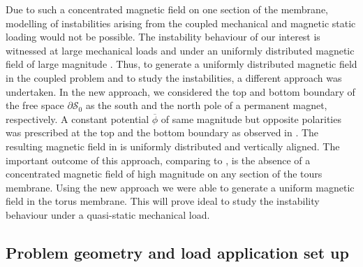 \documentclass[11pt,a4paper,final]{article}
\begin{document}
Due to such a concentrated magnetic field on one section of the membrane, modelling of instabilities arising from the coupled  mechanical and magnetic static loading would not be possible. The instability behaviour of our interest is witnessed at large mechanical loads and under an uniformly distributed magnetic field of large magnitude \cite{Reddy2017,Reddy2018}. Thus, to generate a uniformly distributed magnetic field in the coupled problem and to study the instabilities, a different approach was undertaken. In the new approach, we considered the top and bottom boundary of the free space $\partial \mathcal{S}_0$ as the south and the north pole of a permanent magnet, respectively. A constant potential $\overline{\phi}$ of same magnitude but opposite polarities was prescribed at the top and the bottom boundary as observed in . The resulting magnetic field in  is uniformly distributed and vertically aligned. The important outcome of this approach, comparing  to , is the absence of a concentrated magnetic field of high magnitude on any section of the tours membrane. Using the new approach we were able to generate a uniform magnetic field in the torus membrane. This will prove ideal to study the instability behaviour under a quasi-static mechanical load. \par 

\subsection{Problem geometry and load application set up}
\end{document}

